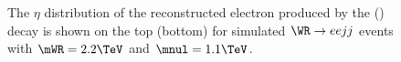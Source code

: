 \begin{figure}[btp]
	\centering
	\label{fig:wrLeptonEtas}
	\caption{The $\eta$ distribution of the reconstructed electron produced by the \WR (\nul) decay is shown on the top (bottom) for 
		simulated $\WR \rightarrow eejj$ events with $\mWR = 2.2 \TeV$ and $\mnul = 1.1 \TeV$.}
\end{figure}

